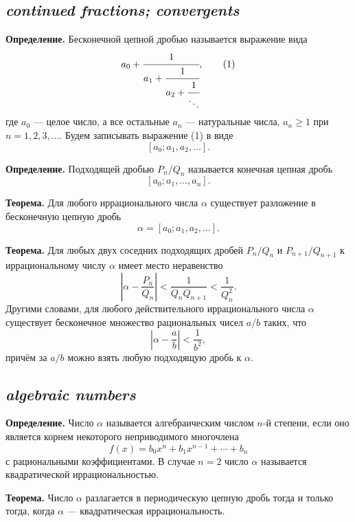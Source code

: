 \subsection*{ \textit{continued fractions; convergents}}
\begin{rusblock}
\textbf{Определение.} Бесконечной цепной дробью называется выражение вида
\[
 a_0+\cfrac1{a_1+\cfrac1{a_2+\cfrac1{\ddots}}},
\tag{1}
\]
где $a_0$ --- целое число, а все остальные $a_n$ --- натуральные числа, $a_n\ge1$ при $n=1,2,3,\ldots$. Будем записывать выражение (1) в виде
\[
[a_0;a_1,a_2,\ldots].
\]

\textbf{Определение.} Подходящей дробью $P_n/Q_n$ называется конечная цепная дробь
\[
[a_0;a_1,\ldots,a_n].
\]

\textbf{Теорема.} Для любого иррационального числа $\alpha$ существует разложение в бесконечную цепную дробь
\[
\alpha=[a_0;a_1,a_2,\ldots].
\]

\textbf{Теорема.} Для любых двух соседних подходящих дробей $P_n/Q_n$ и $P_{n+1}/Q_{n+1}$ к иррациональному числу $\alpha$ имеет место неравенство
\[
\left|\alpha-\frac{P_n}{Q_n}\right|
 <\frac1{Q_nQ_{n+1}}
 <\frac1{Q_n^2}.
\]
Другими словами, для любого действительного иррационального числа $\alpha$ существует бесконечное множество рациональных чисел $a/b$ таких, что
\[
\left|\alpha-\frac ab\right|<\frac1{b^2},
\]
причём за $a/b$ можно взять любую подходящую дробь к $\alpha$.
\end{rusblock}

\subsection*{ \textit{algebraic numbers}}
\begin{rusblock}
\textbf{Определение.} Число $\alpha$ называется алгебраическим числом $n$-й степени, если оно является корнем некоторого неприводимого многочлена
\[
f(x)=b_0x^n+b_1x^{n-1}+\cdots+b_n
\]
с рациональными коэффициентами. В случае $n=2$ число $\alpha$ называется квадратической иррациональностью.

\textbf{Теорема.} Число $\alpha$ разлагается в периодическую цепную дробь тогда и только тогда, когда $\alpha$ --- квадратическая иррациональность.
\end{rusblock}

